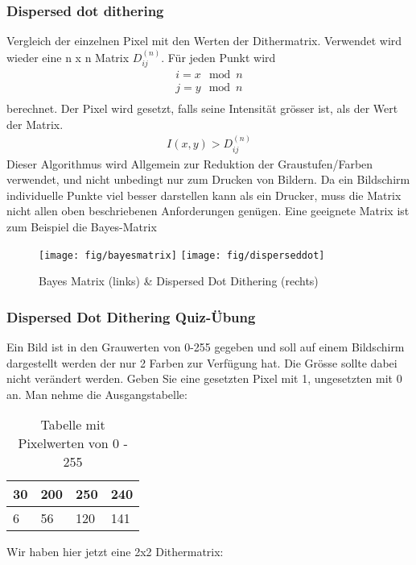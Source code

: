 \subsubsection{Dispersed dot dithering} 
Vergleich der einzelnen Pixel mit den Werten der Dithermatrix.
Verwendet wird wieder eine n x n Matrix \(D_{ij}^{(n)}\). Für jeden Punkt wird
\begin{gather*}
i = x \mod n\\
j = y \mod n\\
\end{gather*}                                           
berechnet. Der Pixel wird gesetzt, falls seine Intensität grösser ist, als der Wert der Matrix.
\begin{gather*}
I(x,y) > D_{ij}^{(n)}   
\end{gather*}
Dieser Algorithmus wird Allgemein zur Reduktion der Graustufen/Farben verwendet, und nicht unbedingt nur zum Drucken von Bildern. Da ein Bildschirm individuelle Punkte viel besser darstellen kann als ein Drucker, muss die Matrix nicht allen oben beschriebenen Anforderungen genügen. Eine geeignete Matrix ist zum Beispiel die Bayes-Matrix
\begin{figure}[!ht]
\centering
\texttt{[image: fig/bayesmatrix]}
\texttt{[image: fig/disperseddot]}
\caption{Bayes Matrix (links) \& Dispersed Dot Dithering (rechts)}
\label{fig:bayesmatrix}
\end{figure}


\subsubsection{Dispersed Dot Dithering Quiz-Übung}
Ein Bild ist in den Grauwerten von 0-255 gegeben und soll auf einem Bildschirm dargestellt werden der nur 2 Farben zur Verfügung hat. Die Grösse sollte dabei nicht verändert werden. Geben Sie eine gesetzten Pixel mit 1, ungesetzten mit 0 an. Man nehme die Ausgangstabelle:

\begin{table}[!ht]
	\centering
	\caption{Tabelle mit Pixelwerten von 0 - 255}
	\label{tbl:ausgangstabelle}
	\begin{tabular}{|l|l|l|l|}
		\hline
		30 & 200 & 250 & 240 \\ \hline
		6  & 56  & 120 & 141 \\ 
		\hline
	\end{tabular}
\end{table}

Wir haben hier jetzt eine 2x2 Dithermatrix:

